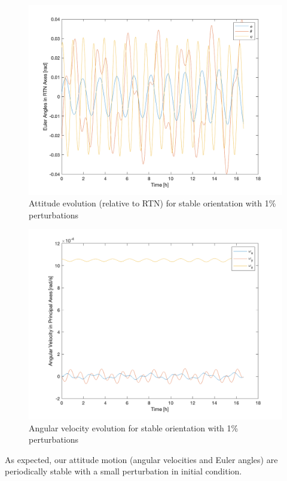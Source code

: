 \begin{figure}[H]
\centering
\includegraphics[scale=0.6]{Images/ps5_problem1c_angle_rtn.png}
\caption{Attitude evolution (relative to RTN) for stable orientation with 1\% perturbations}
\label{fig:ps5_problem1c_angle_rtn}
\end{figure}

\begin{figure}[H]
\centering
\includegraphics[scale=0.6]{Images/ps5_problem1c_angvel.png}
\caption{Angular velocity evolution for stable orientation with 1\% perturbations}
\label{fig:ps5_problem1c_angvel}
\end{figure}

As expected, our attitude motion (angular velocities and Euler angles) are periodically stable with a small perturbation in initial condition.

